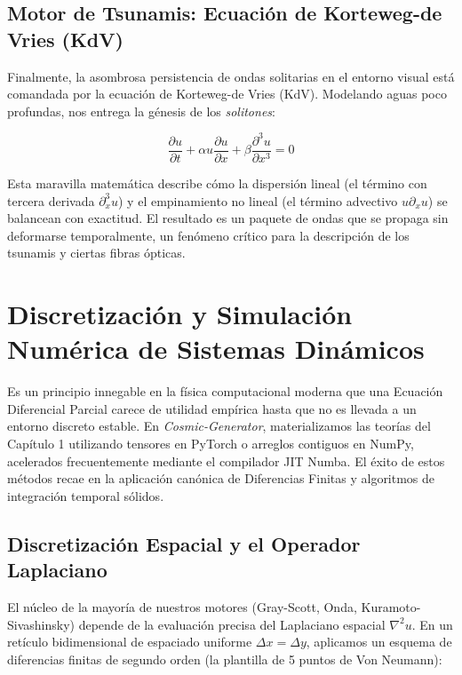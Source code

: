 \documentclass[12pt, openany]{book}
\begin{document}
\subsection{Motor de Tsunamis: Ecuación de Korteweg-de Vries (KdV)}
Finalmente, la asombrosa persistencia de ondas solitarias en el entorno visual está comandada por la ecuación de Korteweg-de Vries (KdV). Modelando aguas poco profundas, nos entrega la génesis de los \textit{solitones}:

\begin{equation}
\frac{\partial u}{\partial t} + \alpha u \frac{\partial u}{\partial x} + \beta \frac{\partial^3 u}{\partial x^3} = 0
\end{equation}

Esta maravilla matemática describe cómo la dispersión lineal (el término con tercera derivada $\partial^3_x u$) y el empinamiento no lineal (el término advectivo $u \partial_x u$) se balancean con exactitud. El resultado es un paquete de ondas que se propaga sin deformarse temporalmente, un fenómeno crítico para la descripción de los tsunamis y ciertas fibras ópticas.

\section{Discretización y Simulación Numérica de Sistemas Dinámicos}
\label{sec:simulacion_numerica}

Es un principio innegable en la física computacional moderna que una Ecuación Diferencial Parcial carece de utilidad empírica hasta que no es llevada a un entorno discreto estable. En \textit{Cosmic-Generator}, materializamos las teorías del Capítulo 1 utilizando tensores en PyTorch o arreglos contiguos en NumPy, acelerados frecuentemente mediante el compilador JIT Numba. El éxito de estos métodos recae en la aplicación canónica de Diferencias Finitas y algoritmos de integración temporal sólidos.

\subsection{Discretización Espacial y el Operador Laplaciano}
El núcleo de la mayoría de nuestros motores (Gray-Scott, Onda, Kuramoto-Sivashinsky) depende de la evaluación precisa del Laplaciano espacial $\nabla^2 u$. En un retículo bidimensional de espaciado uniforme $\Delta x = \Delta y$, aplicamos un esquema de diferencias finitas de segundo orden (la plantilla de 5 puntos de Von Neumann):
\end{document}
